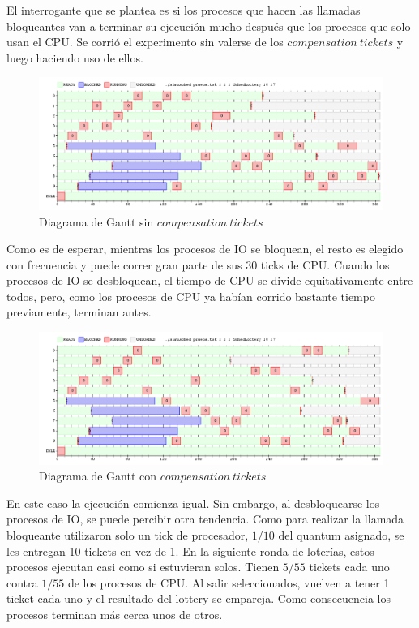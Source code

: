 \documentclass[a4paper]{article}
\begin{document}
El interrogante que se plantea es si los procesos que hacen las llamadas bloqueantes van a terminar su ejecución mucho después que los procesos que solo usan el CPU. Se corrió el experimento sin valerse de los $compensation\ tickets$ y luego haciendo uso de ellos.

\begin{figure}[H]
\centering
\includegraphics[scale=0.5]{../experimentacion/ej10-compensation/gant-sin.png}
\caption{Diagrama de Gantt sin $compensation\ tickets$}
\end{figure}

Como es de esperar, mientras los procesos de IO se bloquean, el resto es elegido con frecuencia y puede correr gran parte de sus 30 ticks de CPU. Cuando los procesos de IO se desbloquean, el tiempo de CPU se divide equitativamente entre todos, pero, como los procesos de CPU ya habían corrido bastante tiempo previamente, terminan antes.

\begin{figure}[H]
\centering
\includegraphics[scale=0.5]{../experimentacion/ej10-compensation/gant-con.png}
\caption{Diagrama de Gantt con $compensation\ tickets$}
\end{figure}

En este caso la ejecución comienza igual. Sin embargo, al desbloquearse los procesos de IO, se puede percibir otra tendencia. Como para realizar la llamada bloqueante utilizaron solo un tick de procesador, $1/10$ del quantum asignado, se les entregan 10 tickets en vez de 1. En la siguiente ronda de loterías, estos procesos ejecutan casi como si estuvieran solos. Tienen $5/55$ tickets cada uno contra $1/55$ de los procesos de CPU. Al salir seleccionados, vuelven a tener 1 ticket cada uno y el resultado del lottery se empareja. Como consecuencia los procesos terminan más cerca unos de otros.
\end{document}
